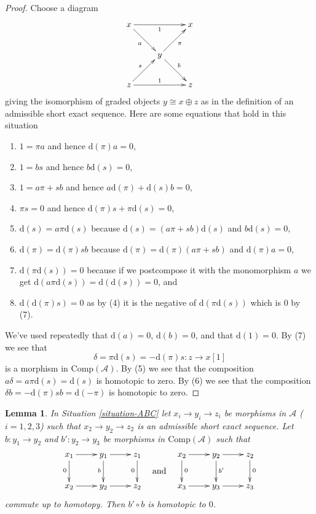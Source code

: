 \documentclass{stacks-project}
\theoremstyle{plain}
\newtheorem{lemma}[subsection]{Lemma}
\theoremstyle{definition}
\theoremstyle{remark}
\numberwithin{equation}{subsection}
\begin{document}
\begin{proof}
Choose a diagram
$$
\xymatrix{
x \ar[rr]_1 \ar[rd]_a & & x \\
& y \ar[ru]_\pi \ar[rd]^b & \\
z \ar[rr]^1 \ar[ru]^s & & z
}
$$
giving the isomorphism of graded objects $y \cong x \oplus z$ as in the
definition of an admissible short exact sequence. Here are some equations
that hold in this situation
\begin{enumerate}
\item $1 = \pi a$ and hence $\text{d}(\pi) a = 0$,
\item $1 = b s$ and hence $b \text{d}(s) = 0$,
\item $1 = a \pi + s b$ and hence $a \text{d}(\pi) + \text{d}(s) b = 0$,
\item $\pi s = 0$ and hence $\text{d}(\pi)s + \pi \text{d}(s) = 0$,
\item $\text{d}(s) = a \pi \text{d}(s)$ because
$\text{d}(s) = (a \pi + s b)\text{d}(s)$ and $b\text{d}(s) = 0$,
\item $\text{d}(\pi) = \text{d}(\pi) s b$ because
$\text{d}(\pi) = \text{d}(\pi)(a \pi + s b)$ and $\text{d}(\pi)a = 0$,
\item $\text{d}(\pi \text{d}(s)) = 0$ because if we postcompose it
with the monomorphism $a$ we get
$\text{d}(a\pi \text{d}(s)) = \text{d}(\text{d}(s)) = 0$, and
\item $\text{d}(\text{d}(\pi)s) = 0$ as by (4) it is the negative
of $\text{d}(\pi\text{d}(s))$ which is $0$ by (7).
\end{enumerate}
We've used repeatedly that $\text{d}(a) = 0$, $\text{d}(b) = 0$,
and that $\text{d}(1) = 0$. By (7) we see that
$$
\delta = \pi \text{d}(s) = - \text{d}(\pi) s : z \to x[1]
$$
is a morphism in $\text{Comp}(\mathcal{A})$. By (5) we see that
the composition $a \delta = a \pi \text{d}(s) = \text{d}(s)$
is homotopic to zero. By (6) we see that the composition
$\delta b = - \text{d}(\pi)sb = \text{d}(-\pi)$ is homotopic to zero.
\end{proof}

\begin{lemma}
\label{lemma-triseq}
In Situation \ref{situation-ABC} let $x_i \to y_i \to z_i$
be morphisms in $\mathcal{A}$ ($i=1,2,3$) such that
$x_2 \to y_2\to z_2$ is an admissible short exact sequence.
Let $b : y_1 \to y_2$ and $b' : y_2\to y_3$ be morphisms
in $\text{Comp}(\mathcal{A})$ such that
$$
\vcenter{
\xymatrix{
x_1 \ar[d]_0 \ar[r] &
y_1 \ar[r] \ar[d]_b &
z_1 \ar[d]_0 \\
x_2 \ar[r] & y_2 \ar[r] & z_2
}
}
\quad\text{and}\quad
\vcenter{
\xymatrix{
x_2 \ar[d]^0 \ar[r] &
y_2 \ar[r] \ar[d]^{b'} &
z_2 \ar[d]^0 \\
x_3 \ar[r] & y_3 \ar[r] & z_3
}
}
$$
commute up to homotopy. Then $b'\circ b$ is homotopic to $0$.
\end{lemma}
\end{document}
